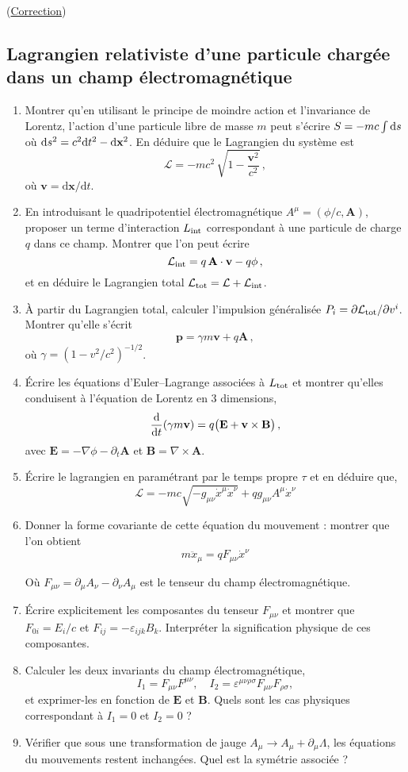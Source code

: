 \documentclass[a4paper,10pt]{report}
\begin{document}
(\hyperref[subsec:correctionRel_eq]{Correction})

\subsection{Lagrangien relativiste d'une particule chargée dans un champ électromagnétique}
\begin{enumerate}
	\item Montrer qu'en utilisant le principe de moindre action et l'invariance de Lorentz, l'action d'une particule libre de masse $m$ peut s'écrire $S=-mc\int \text ds$ où $\text ds^2=c^2\text{d}t^2-\text{d}\textbf{x}^2$. En déduire que le Lagrangien du système est 
	\[
\mathcal{L} = -mc^2\,\sqrt{1-\frac{\textbf{v}^2}{c^2}}\,,
	\]
	où ${\textbf{v}}=\text{d}\textbf{x}/\text{d}t$.
	\item En introduisant le quadripotentiel électromagnétique $A^\mu=(\phi/c,\textbf{A})$, proposer un terme d'interaction $L_{\rm int}$ correspondant à une particule de charge $q$ dans ce champ. Montrer que l'on peut écrire 
	\[
\mathcal{L}_{\rm int}=q\,\textbf{A}\cdot{\textbf{v}}-q\phi\,,
	\]
	et en déduire le Lagrangien total $\mathcal{L}_{\rm tot}=\mathcal{L}+\mathcal{L}_{\rm int}$.
	\item À partir du Lagrangien total, calculer l'impulsion généralisée $P_i=\partial \mathcal{L}_{\rm tot}/\partial v^i$. Montrer qu'elle s'écrit
	\[
	\textbf{p} = \gamma m\textbf{v} + q\textbf{A}\,,
	\]
	où $\gamma=(1-v^2/c^2)^{-1/2}$.
	
	\item Écrire les équations d'Euler–Lagrange associées à $L_{\rm tot}$ et montrer qu'elles conduisent à l'équation de Lorentz en 3 dimensions,
	\[
	\frac{\text d}{\text{d}t}(\gamma m \textbf{v}) = q\bigl(\textbf{E} + \textbf{v}\times \textbf{B}\bigr)\,,
	\]
	avec $\textbf{E}=-\nabla\phi-\partial_t\textbf{A}$ et $\textbf{B}=\nabla\times \textbf{A}$.
	\item Écrire le lagrangien en paramétrant par le temps propre $\tau$ et en déduire que,
	$$\mathcal{L} = -mc \sqrt{-g_{\mu\nu}\dot{x}^\mu\dot{x}^\nu} + q g_{\mu\nu}A^\mu \dot{x}^\nu$$
	\item Donner la forme covariante de cette équation du mouvement : montrer que l'on obtient 
	$$m\ddot{x}_\mu = q F_{\mu\nu}\dot x^\nu$$
	
	Où $F_{\mu\nu} = \partial_\mu A_\nu - \partial_\nu A_\mu$ est le tenseur du champ électromagnétique.
	\item Écrire explicitement les composantes du tenseur $F_{\mu\nu}$ et montrer que $F_{0i}=E_i/c$ et $F_{ij}=-\varepsilon_{ijk}B_k$. Interpréter la signification physique de ces composantes.
	\item Calculer les deux invariants du champ électromagnétique,
	\[
	I_1 = F_{\mu\nu}F^{\mu\nu}, 
	\quad 
	I_2 = \varepsilon^{\mu\nu\rho\sigma}F_{\mu\nu}F_{\rho\sigma},
	\]
	et exprimer-les en fonction de $\textbf{E}$ et $\textbf{B}$. Quels sont les cas physiques correspondant à $I_1=0$ et $I_2=0$ ?
	\item Vérifier que sous une transformation de jauge $A_\mu \to A_\mu + \partial_\mu\Lambda$, les équations du mouvements restent inchangées. Quel est la symétrie associée ?
\end{enumerate}
\end{document}
